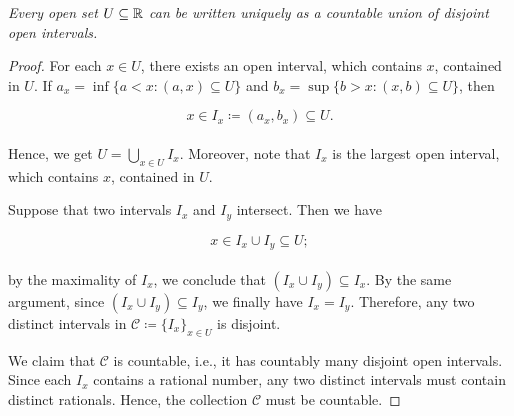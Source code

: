 \documentclass[12pt, a4paper, openany, twoside]{book}
\theoremstyle{definition}
\theoremstyle{remark}
\theoremstyle{plain}
\numberwithin{equation}{section}
\begin{document}
\vspace{5mm}
\begin{tcolorbox}[colback=yellow!10!white,colframe=red!75!black,title=Theorem 1.1.3]\label{Theorem 1.1.3}
    \emph{Every open set $U\subseteq{\mathbb {R}}$ can be written uniquely as a countable union of disjoint open intervals.}
\end{tcolorbox}
\begin{proof}
    For each $x\in U$, there exists an open interval, which contains $x$, contained in $U$. If $a_x=\inf\{a<x:(a,x)\subseteq U\}$ and $b_x=\sup\{b>x:(x,b)\subseteq U\}$, then 

    \[x\in I_x\coloneqq(a_x,b_x)\subseteq U.\]
    \\
    Hence, we get $U=\bigcup_{x\in U}{I_x}$. Moreover, note that $I_x$ is the largest open interval, which contains $x$, contained in $U$. 

    Suppose that two intervals $I_x$ and $I_y$ intersect. Then we have

    \[x\in I_x\cup I_y\subseteq U;\]
    \\
    by the maximality of $I_x$, we conclude that $(I_x\cup I_y)\subseteq I_x$. By the same argument, since $(I_x\cup I_y)\subseteq I_y$, we finally have $I_x=I_y$. Therefore, any two distinct intervals in $\mathcal{C}\coloneqq\{I_x\}_{x\in U}$ is disjoint.

    We claim that $\mathcal{C}$ is countable, i.e., it has countably many disjoint open intervals. Since each $I_x$ contains a rational number, any two distinct intervals must contain distinct rationals. Hence, the collection $\mathcal{C}$ must be countable.
\end{proof}
\vspace{5mm}
\end{document}
